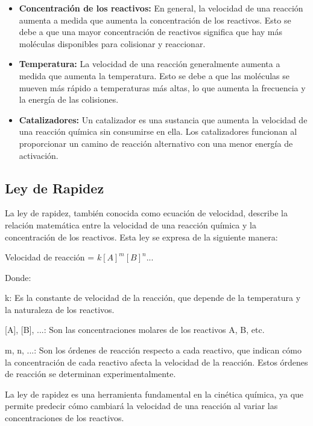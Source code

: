 \begin{itemize}
    \item \textbf{Concentración de los reactivos:} En general, la velocidad de una reacción aumenta a medida que aumenta la concentración de los reactivos. Esto se debe a que una mayor concentración de reactivos significa que hay más moléculas disponibles para colisionar y reaccionar. 

    \item \textbf{Temperatura:} La velocidad de una reacción generalmente aumenta a medida que aumenta la temperatura. Esto se debe a que las moléculas se mueven más rápido a temperaturas más altas, lo que aumenta la frecuencia y la energía de las colisiones. 

    \item \textbf{Catalizadores:} Un catalizador es una sustancia que aumenta la velocidad de una reacción química sin consumirse en ella. Los catalizadores funcionan al proporcionar un camino de reacción alternativo con una menor energía de activación. 
\end{itemize}

\subsection{Ley de Rapidez}
La ley de rapidez, también conocida como ecuación de velocidad, describe la relación matemática entre la velocidad de una reacción química y la concentración de los reactivos. Esta ley se expresa de la siguiente manera: 

Velocidad de reacción = $k[A]^m[B]^n...$ 
 

Donde: 

k: Es la constante de velocidad de la reacción, que depende de la temperatura y la naturaleza de los reactivos. 

[A], [B], ...: Son las concentraciones molares de los reactivos A, B, etc. 

m, n, ...: Son los órdenes de reacción respecto a cada reactivo, que indican cómo la concentración de cada reactivo afecta la velocidad de la reacción. Estos órdenes de reacción se determinan experimentalmente. 

La ley de rapidez es una herramienta fundamental en la cinética química, ya que permite predecir cómo cambiará la velocidad de una reacción al variar las concentraciones de los reactivos.

